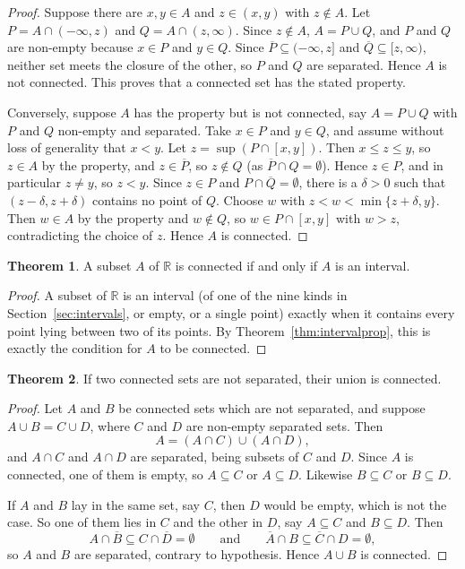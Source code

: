 \documentclass[11pt,a4paper]{article}
\numberwithin{equation}{section}
\theoremstyle{definition}
\newtheorem{thm}{Theorem}[subsection]
\begin{document}
\begin{proof}
Suppose there are $x, y \in A$ and $z \in (x,y)$ with $z\notin A$. Let $P = A \cap (-\infty, z)$ and $Q = A\cap (z, \infty)$. Since $z\notin A$, $A = P \cup Q$, and $P$ and $Q$ are non-empty because $x\in P$ and $y \in Q$. Since $\overline{P}\subseteq(-\infty,z]$ and $\overline{Q}\subseteq[z,\infty)$, neither set meets the closure of the other, so $P$ and $Q$ are separated. Hence $A$ is not connected. This proves that a connected set has the stated property.

Conversely, suppose $A$ has the property but is not connected, say $A = P\cup Q$ with $P$ and $Q$ non-empty and separated. Take $x\in P$ and $y \in Q$, and assume without loss of generality that $x<y$. Let $z = \sup (P\cap [x,y])$. Then $x\leq z\leq y$, so $z\in A$ by the property, and $z\in\overline{P}$, so $z\notin Q$ (as $\overline{P}\cap Q = \emptyset$). Hence $z\in P$, and in particular $z\neq y$, so $z<y$. Since $z \in P$ and $P\cap\overline{Q} = \emptyset$, there is a $\delta>0$ such that $(z-\delta, z+\delta)$ contains no point of $Q$. Choose $w$ with $z<w<\min\{z+\delta, y\}$. Then $w\in A$ by the property and $w\notin Q$, so $w\in P\cap[x,y]$ with $w>z$, contradicting the choice of $z$. Hence $A$ is connected.
\end{proof}


\begin{thm}
A subset $A$ of $\mathbb{R}$ is connected if and only if $A$ is an interval.
\end{thm}

\begin{proof}
A subset of $\mathbb{R}$ is an interval (of one of the nine kinds in Section~\ref{sec:intervals}, or empty, or a single point) exactly when it contains every point lying between two of its points. By Theorem~\ref{thm:intervalprop}, this is exactly the condition for $A$ to be connected.
\end{proof}


\begin{thm}
If two connected sets are not separated, their union is connected.
\end{thm}

\begin{proof}
Let $A$ and $B$ be connected sets which are not separated, and suppose $A\cup B = C \cup D$, where $C$ and $D$ are non-empty separated sets. Then
$$A = (A\cap C) \cup (A\cap D),$$
and $A\cap C$ and $A\cap D$ are separated, being subsets of $C$ and $D$. Since $A$ is connected, one of them is empty, so $A\subseteq C$ or $A\subseteq D$. Likewise $B\subseteq C$ or $B\subseteq D$.

If $A$ and $B$ lay in the same set, say $C$, then $D$ would be empty, which is not the case. So one of them lies in $C$ and the other in $D$, say $A\subseteq C$ and $B\subseteq D$. Then
$$A \cap \overline{B} \subseteq C \cap \overline{D} = \emptyset \qquad\text{and}\qquad \overline{A}\cap B \subseteq \overline{C} \cap D = \emptyset,$$
so $A$ and $B$ are separated, contrary to hypothesis. Hence $A\cup B$ is connected.
\end{proof}
\end{document}
